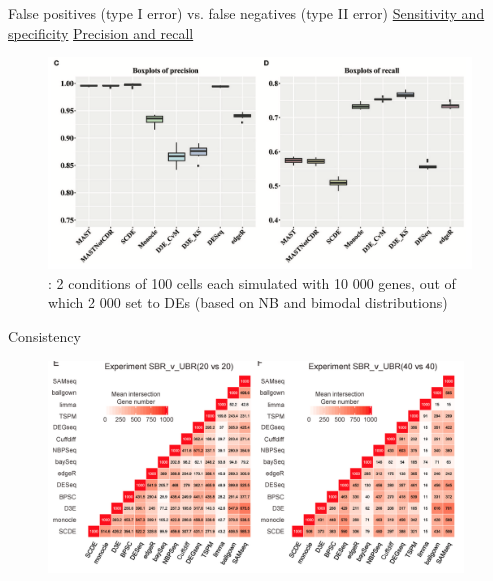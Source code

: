 \documentclass{beamer}\usepackage[]{graphicx}\usepackage[]{color}
\begin{document}
\begin{frame}
False positives (type I error) vs.  false negatives (type II error) \newline
\scriptsize
\href{https://en.wikipedia.org/wiki/Sensitivity_and_specificity}{Sensitivity and specificity} \newline
\href{https://en.wikipedia.org/wiki/Precision_and_recall}{Precision and recall}
\vspace{0.5cm}
\scriptsize
\begin{center}
\begin{figure}
\includegraphics[width=12cm]{Images/DalMolin_fig2cd.png}
\caption{\cite{DalMolin2017}: 2 conditions of 100 cells each simulated with 10 000 genes, out of which 2 000 set to DEs (based on NB and bimodal distributions)}
\end{figure}
\end{center}
\end{frame}


\begin{frame}
Consistency
\vspace{0.5cm}
\begin{center}
\begin{figure}
\includegraphics[width=11cm]{Images/Miao_fig1ef.png}
\caption{\cite{Miao2017}}
\end{figure}
\end{center}
\end{frame}
\end{document}
